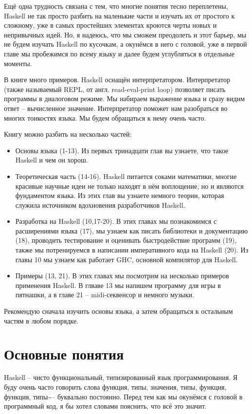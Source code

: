 Ещё одна трудность связана с тем, что многие понятия тесно переплетены,
Haskell не так просто разбить на маленькие части и изучать их от
простого к сложному, уже в самых простейших элементах кроются черты
новых и непривычных идей. Но, я надеюсь, что мы сможем преодолеть и этот
барьер, мы не будем изучать Haskell по кусочкам, а окунёмся в него с
головой, уже в первой главе мы пробежимся по всему языку и далее будем
углубляться в отдельные моменты.

В книге много примеров. Haskell оснащён интерпретатором. Интерпретатор
(также называемый REPL, от англ. read-eval-print loop) позволяет писать
программы в диалоговом режиме. Мы набираем выражение языка и сразу видим
ответ -- вычисленное значение. Интерпретатор поможет нам разобраться во
многих тонкостях языка. Мы будем обращаться к нему очень часто.

Книгу можно разбить на несколько частей:

\begin{itemize}
\item
  Основы языка (1-13). Из первых тринадцати глав вы узнаете, что такое
  Haskell и чем он хорош.
\item
  Теоретическая часть (14-16). Haskell питается соками математики,
  многие красивые научные идеи не только находят в нём воплощение, но и
  являются фундаментом языка. Из этих глав вы узнаете немного теории,
  которая служила источником вдохновения разработчиков Haskell.
\item
  Разработка на Haskell (10,17-20). В этих главах мы познакомимся с
  расширениями языка (17), мы узнаем как писать библиотеки и
  документацию (18), проводить тестирование и оценивать быстродействие
  программ (19), также мы потренируемся в написании императивного кода
  на Haskell (20). Из главы 10 мы узнаем как работает GHC, основной
  компилятор для Haskell.
\item
  Примеры (13, 21). В этих главах мы посмотрим на несколько примеров
  применения Haskell. В глваве 13 мы напишем программу для игры в
  пятнашки, а в главе 21 -- midi-секвенсор и немного музыки.
\end{itemize}

Рекомендую сначала изучить основы языка, а затем обращаться к остальным
частям в любом порядке.

\section{Основные понятия}

Haskell -- чисто функциональный, типизированный язык программирования. Я
буду очень часто говорить слова функция, типы, значения, типы, функция,
функция, типы\textasciitilde{}-- буквально постоянно. Перед тем как мы
окунёмся с головой в программный код, я бы хотел словами пояснить, что
всё это значит.

